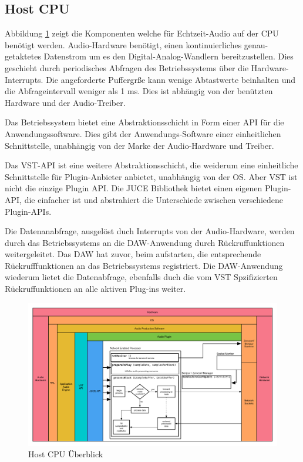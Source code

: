 \subsection{Host CPU}

Abbildung \ref{fig:arch_02} zeigt die Komponenten welche für Echtzeit-Audio auf der CPU benötigt werden. Audio-Hardware benötigt, einen kontinuierliches genau-getaktetes Datenstrom um es den Digital-Analog-Wandlern bereitzustellen. Dies geschieht durch periodisches Abfragen des Betriebssystems über die Hardware-Interrupts. Die angeforderte Puffergrße kann wenige Abtastwerte beinhalten und die Abfrageintervall weniger als 1 ms. Dies ist abhängig von der benützten Hardware und der Audio-Treiber.

Das Betriebssystem bietet eine Abstraktionsschicht in Form einer API für die Anwendungssoftware. Dies gibt der Anwendungs-Software einer einheitlichen Schnittstelle, unabhängig von der Marke der Audio-Hardware und Treiber.

Das VST-API ist eine weitere Abstraktionsschicht, die weiderum eine einheitliche Schnittstelle für Plugin-Anbieter anbietet, unabhängig von der OS. Aber VST ist nicht die einzige Plugin API. Die JUCE Bibliothek bietet einen eigenen Plugin-API, die einfacher ist und abstrahiert die Unterschiede zwischen verschiedene Plugin-APIs.

Die Datenanabfrage, ausgelöst duch Interrupts von der Audio-Hardware, werden durch das Betriebssystems an die DAW-Anwendung durch Rückruffunktionen weitergeleitet. Das DAW hat zuvor, beim aufstarten, die entsprechende Rückrufffunktionen an das Betriebssystems registriert. Die DAW-Anwendung wiederum lietet die Datenabfrage, ebenfalls duch die vom VST Spzifizierten Rückruffunktionen an alle aktiven Plug-ins weiter.

\begin{figure}[H]
    \centering
    \includegraphics[width=\textwidth]{assets/architecture_02.pdf}
    \caption{Host CPU Überblick}
    \label{fig:arch_02}
\end{figure}

